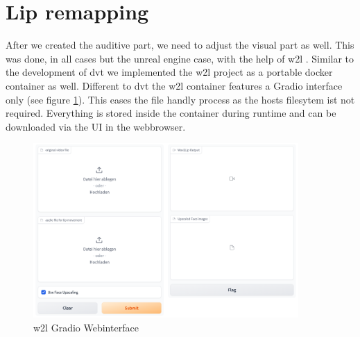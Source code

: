 \documentclass[
  a4paper,  %
  twoside,  %
  bibliography=totoc,
  headsepline,
  cleardoublepage=empty,
  parskip=half,
  draft=false
]{scrbook}
\begin{document}
\section{Lip remapping}
 After we created the auditive part, we need to adjust the visual part as well. This was done, in all cases but the unreal engine case, with the help of \gls{w2l} \cite{mukhopadhyayWav2LipAccuratelyLipsyncing2023}. Similar to the development of \gls{dvt} we implemented the \gls{w2l} project as a portable docker container as well. Different to \gls{dvt} the \gls{w2l} container features a Gradio interface only (see figure \ref{fig:w2l-gradio}). This eases the file handly process as the hosts filesytem ist not required. Everything is stored inside the container during runtime and can be downloaded via the UI in the webbrowser.
 \begin{figure}[h]
  \centering
  \includegraphics[width=0.9\textwidth]{./graphics/images/wav2lip/w2l-gradio.png}
  \caption{\gls{w2l} Gradio Webinterface}
  \label{fig:w2l-gradio}
\end{figure}
\end{document}
